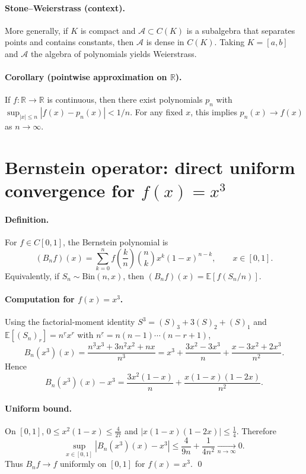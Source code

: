 \documentclass[11pt,a4paper]{article}
\theoremstyle{definition}
\theoremstyle{definition}
\theoremstyle{plain}
\theoremstyle{remark}
\begin{document}
\paragraph{Stone--Weierstrass (context).}
More generally, if \(K\) is compact and \(\mathcal A\subset C(K)\) is a subalgebra that separates points and contains constants,
then \(\mathcal A\) is dense in \(C(K)\). Taking \(K=[a,b]\) and \(\mathcal A\) the algebra of polynomials yields Weierstrass.

\paragraph{Corollary (pointwise approximation on \(\mathbb R\)).}
If \(f:\mathbb R\to\mathbb R\) is continuous, then there exist polynomials \(p_n\) with
\(\sup_{|x|\le n}|f(x)-p_n(x)|<1/n\). For any fixed \(x\), this implies \(p_n(x)\to f(x)\) as \(n\to\infty\).

\section*{Bernstein operator: direct uniform convergence for \(f(x)=x^3\)}

\paragraph{Definition.}
For \(f\in C[0,1]\), the Bernstein polynomial is
\[
(B_n f)(x)=\sum_{k=0}^n f\!\left(\frac{k}{n}\right)\binom{n}{k}x^{k}(1-x)^{n-k},\qquad x\in[0,1].
\]
Equivalently, if \(S_n\sim\mathrm{Bin}(n,x)\), then \((B_n f)(x)=\mathbb E\!\left[f(S_n/n)\right]\).

\paragraph{Computation for \(f(x)=x^3\).}
Using the factorial-moment identity \(S^3=(S)_3+3(S)_2+(S)_1\) and
\(\mathbb E[(S_n)_r]=n^{\underline r}x^r\) with \(n^{\underline r}=n(n-1)\cdots(n-r+1)\),
\[
B_n(x^3)(x)=\frac{n^{\underline 3}x^3+3n^{\underline 2}x^2+n x}{n^3}
= x^3 + \frac{3x^2-3x^3}{n} + \frac{x-3x^2+2x^3}{n^2}.
\]
Hence
\[
B_n(x^3)(x)-x^3=\frac{3x^2(1-x)}{n}+\frac{x(1-x)(1-2x)}{n^2}.
\]

\paragraph{Uniform bound.}
On \([0,1]\), \(0\le x^2(1-x)\le \tfrac{4}{27}\) and \(|x(1-x)(1-2x)|\le \tfrac14\).
Therefore
\[
\sup_{x\in[0,1]} |B_n(x^3)(x)-x^3|
\le \frac{4}{9n}+\frac{1}{4n^2}\xrightarrow[n\to\infty]{}0.
\]
Thus \(B_n f\to f\) uniformly on \([0,1]\) for \(f(x)=x^3\).
\qed
\end{document}

